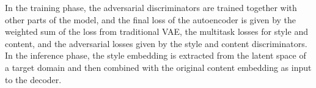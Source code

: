 \documentclass[11pt,a4paper]{article}
\begin{document}
In the training phase, the adversarial discriminators are trained 
together with other parts of the model, and the final loss of 
the autoencoder is given by the weighted sum of the loss from traditional VAE, 
the multitask losses for style and content, 
and the adversarial losses given by the style and content discriminators. 
In the inference phase, the style embedding is extracted from the 
latent space of a target domain and then combined with the original content embedding as input to the decoder.
%
\end{document}
